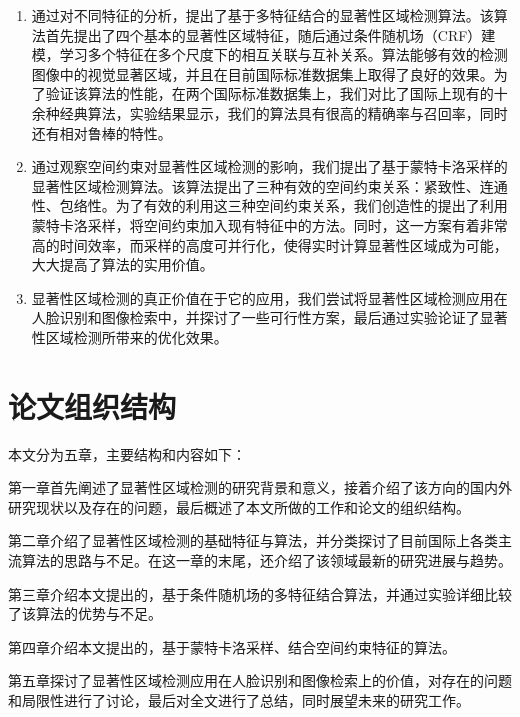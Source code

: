 \begin{enumerate}
\item 通过对不同特征的分析，提出了基于多特征结合的显著性区域检测算法。该算法首先提出了四个基本的显著性区域特征，随后通过条件随机场（CRF）建模，学习多个特征在多个尺度下的相互关联与互补关系。算法能够有效的检测图像中的视觉显著区域，并且在目前国际标准数据集上取得了良好的效果。为了验证该算法的性能，在两个国际标准数据集上，我们对比了国际上现有的十余种经典算法，实验结果显示，我们的算法具有很高的精确率与召回率，同时还有相对鲁棒的特性。
\item 通过观察空间约束对显著性区域检测的影响，我们提出了基于蒙特卡洛采样的显著性区域检测算法。该算法提出了三种有效的空间约束关系：紧致性、连通性、包络性。为了有效的利用这三种空间约束关系，我们创造性的提出了利用蒙特卡洛采样，将空间约束加入现有特征中的方法。同时，这一方案有着非常高的时间效率，而采样的高度可并行化，使得实时计算显著性区域成为可能，大大提高了算法的实用价值。
\item 显著性区域检测的真正价值在于它的应用，我们尝试将显著性区域检测应用在人脸识别和图像检索中，并探讨了一些可行性方案，最后通过实验论证了显著性区域检测所带来的优化效果。
\end{enumerate}

\section{论文组织结构}
本文分为五章，主要结构和内容如下：

第一章首先阐述了显著性区域检测的研究背景和意义，接着介绍了该方向的国内外研究现状以及存在的问题，最后概述了本文所做的工作和论文的组织结构。

第二章介绍了显著性区域检测的基础特征与算法，并分类探讨了目前国际上各类主流算法的思路与不足。在这一章的末尾，还介绍了该领域最新的研究进展与趋势。

第三章介绍本文提出的，基于条件随机场的多特征结合算法，并通过实验详细比较了该算法的优势与不足。

第四章介绍本文提出的，基于蒙特卡洛采样、结合空间约束特征的算法。

第五章探讨了显著性区域检测应用在人脸识别和图像检索上的价值，对存在的问题和局限性进行了讨论，最后对全文进行了总结，同时展望未来的研究工作。
